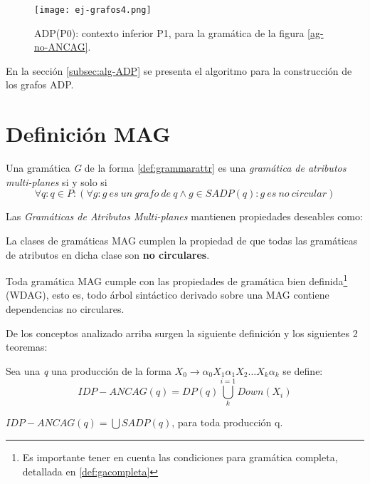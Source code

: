 \begin{figure}\centering
 \texttt{[image: ej-grafos4.png]}
\caption{\label{adp-wuu-yang} ADP(P0): contexto inferior P1, para la gramática de la figura \ref{ag-no-ANCAG}.}
\end{figure}

En la sección \ref{subsec:alg-ADP} se presenta el algoritmo para la construcción de los grafos ADP.

\section{Definición MAG}
\label{def:MAG}
Una gramática \textit{G} de la forma \ref{def:grammarattr} es una \textit{gramática de atributos multi-planes} si y solo si 
\begin{equation}
\forall q : q \in P: (\forall g:g\ es\ un\ grafo\ de\ q \wedge g \in SADP(q) : g\ es\ no\ circular) 
\end{equation}

Las \textit{Gramáticas de Atributos Multi-planes} mantienen propiedades deseables como:
\begin{items}
\item La clases de gramáticas MAG cumplen la propiedad de que todas las gramáticas de atributos en dicha clase son \textbf{no circulares}.
\item Toda gramática MAG cumple con las propiedades de gramática bien definida\footnote{Es importante tener en cuenta las condiciones para gramática completa, detallada en \ref{def:gacompleta}} (WDAG), esto es, todo árbol sintáctico derivado sobre una MAG contiene dependencias no circulares.
\end{items}

De los conceptos analizado arriba surgen la siguiente definición y los siguientes 2 teoremas:

\begin{definition}
\label{def:ancag}
 Sea una \textit{q} una producción de la forma $X_{0}\rightarrow \alpha_{0} X_{1} \alpha_{1} X_{2} \dots X_{k} \alpha_{k}$ se define:
\begin{equation}
 IDP-ANCAG(q) = DP(q) \bigcup\limits_{k}^{i=1}{Down(X_{i})}
\end{equation}

\end{definition}

\begin{theorem}
\label{th:ancag1}
$IDP-ANCAG(q) = \bigcup SADP(q)$, para toda producción q. 
\end{theorem}

